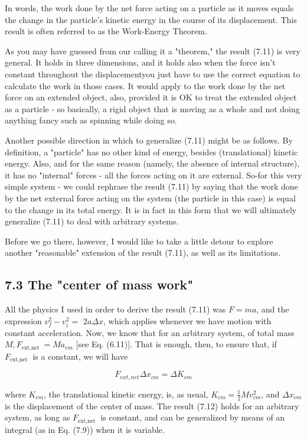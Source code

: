 \documentclass[10pt]{article}
\begin{document}
In words, the work done by the net force acting on a particle as it moves equals the change in the particle's kinetic energy in the course of its displacement. This result is often referred to as the Work-Energy Theorem.

As you may have guessed from our calling it a "theorem," the result (7.11) is very general. It holds in three dimensions, and it holds also when the force isn't constant throughout the displacementyou just have to use the correct equation to calculate the work in those cases. It would apply to the work done by the net force on an extended object, also, provided it is OK to treat the extended object as a particle - so basically, a rigid object that is moving as a whole and not doing anything fancy such as spinning while doing so.

Another possible direction in which to generalize (7.11) might be as follows. By definition, a "particle" has no other kind of energy, besides (translational) kinetic energy. Also, and for the same reason (namely, the absence of internal structure), it has no "internal" forces - all the forces acting on it are external. So-for this very simple system - we could rephrase the result (7.11) by saying that the work done by the net external force acting on the system (the particle in this case) is equal to the change in its total energy. It is in fact in this form that we will ultimately generalize (7.11) to deal with arbitrary systems.

Before we go there, however, I would like to take a little detour to explore another "reasonable" extension of the result (7.11), as well as its limitations.

\subsection*{7.3 The "center of mass work"}
All the physics I used in order to derive the result (7.11) was $F=m a$, and the expression $v_{f}^{2}-v_{i}^{2}=$ $2 a \Delta x$, which applies whenever we have motion with constant acceleration. Now, we know that for an arbitrary system, of total mass $M, F_{\text {ext,net }}=M a_{c m}$ [see Eq. (6.11)]. That is enough, then, to ensure that, if $F_{\text {ext,net }}$ is a constant, we will have


\begin{equation*}
F_{e x t, n e t} \Delta x_{c m}=\Delta K_{c m} \tag{7.12}
\end{equation*}


where $K_{c m}$, the translational kinetic energy, is, as usual, $K_{c m}=\frac{1}{2} M v_{c m}^{2}$, and $\Delta x_{c m}$ is the displacement of the center of mass. The result (7.12) holds for an arbitrary system, as long as $F_{\text {ext,net }}$ is constant, and can be generalized by means of an integral (as in Eq. (7.9)) when it is variable.
\end{document}
